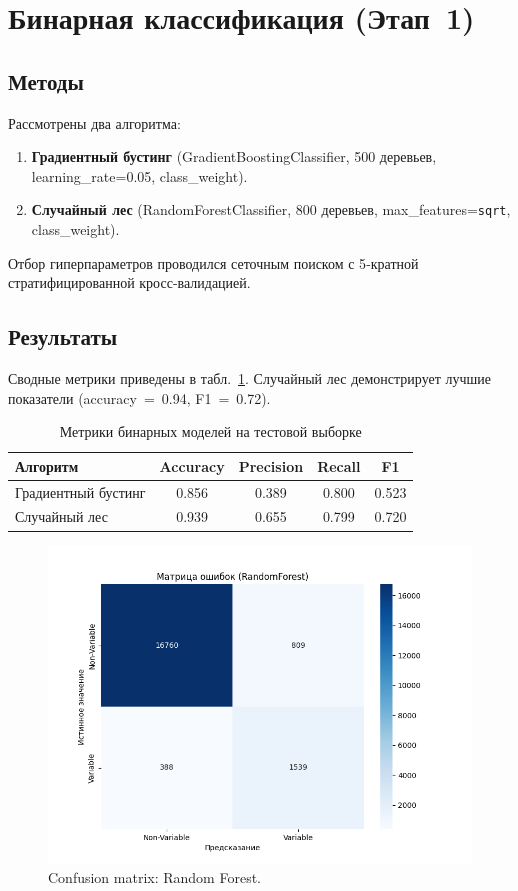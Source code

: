 \documentclass[12pt,a4paper]{article}
\begin{document}
\section{Бинарная классификация (Этап~1)}
\subsection{Методы}
Рассмотрены два алгоритма:
\begin{enumerate}
    \item \textbf{Градиентный бустинг} (GradientBoostingClassifier, 500 деревьев, learning\_rate=0.05, class\_weight).
    \item \textbf{Случайный лес} (RandomForestClassifier, 800 деревьев, max\_features=\texttt{sqrt}, class\_weight).
\end{enumerate}
Отбор гиперпараметров проводился сеточным поиском с 5‑кратной стратифицированной кросс‑валидацией.

\subsection{Результаты}
Сводные метрики приведены в табл.~\ref{tab:bin-metrics}. Случайный лес демонстрирует лучшие показатели (accuracy~=~0.94, F1~=~0.72).

\begin{table}[H]
    \centering
    \caption{Метрики бинарных моделей на тестовой выборке}
    \label{tab:bin-metrics}
    \begin{tabular}{lcccc}
        \toprule
        \textbf{Алгоритм} & \textbf{Accuracy} & \textbf{Precision} & \textbf{Recall} & \textbf{F1}\\
        \midrule
        Градиентный бустинг & 0.856 & 0.389 & 0.800 & 0.523\\
        Случайный лес       & 0.939 & 0.655 & 0.799 & 0.720\\
        \bottomrule
    \end{tabular}
\end{table}

\begin{figure}[H]
    \centering
    \includegraphics[width=.6\linewidth]{confusion_matrix_RandomForest.png}
    \caption{Confusion matrix: Random Forest.}
    \label{fig:cm-rf}
\end{figure}
\end{document}
